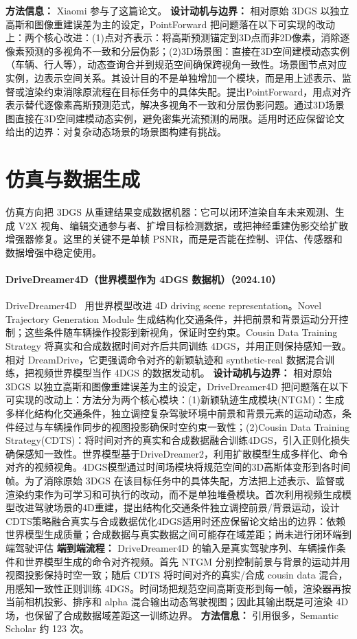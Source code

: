 \textbf{方法信息：} Xiaomi 参与了这篇论文。
\textbf{设计动机与边界：} 相对原始 3DGS 以独立高斯和图像重建误差为主的设定，PointForward 把问题落在以下可实现的改动上：两个核心改进：(1)点对齐表示：将高斯预测锚定到3D点而非2D像素，消除逐像素预测的多视角不一致和分层伪影；(2)3D场景图：直接在3D空间建模动态实例（车辆、行人等），动态查询合并到规范空间确保跨视角一致性。场景图节点对应实例，边表示空间关系。其设计目的不是单独增加一个模块，而是用上述表示、监督或渲染约束消除原流程在目标任务中的具体失配。提出PointForward，用点对齐表示替代逐像素高斯预测范式，解决多视角不一致和分层伪影问题。通过3D场景图直接在3D空间建模动态实例，避免密集光流预测的局限。适用时还应保留论文给出的边界：对复杂动态场景的场景图构建有挑战。

\section{仿真与数据生成}

仿真方向把 3DGS 从重建结果变成数据机器：它可以闭环渲染自车未来观测、生成 V2X 视角、编辑交通参与者、扩增目标检测数据，或把神经重建伪影交给扩散增强器修复。这里的关键不是单帧 PSNR，而是是否能在控制、评估、传感器和数据增强中稳定使用。
\paragraph{DriveDreamer4D（世界模型作为 4DGS 数据机）（2024.10）}
DriveDreamer4D~\cite{2410_13571} 用世界模型改进 4D driving scene representation。Novel Trajectory Generation Module 生成结构化交通条件，并把前景和背景运动分开控制；这些条件随车辆操作投影到新视角，保证时空约束。Cousin Data Training Strategy 将真实和合成数据时间对齐后共同训练 4DGS，并用正则保持感知一致。相对 DreamDrive，它更强调命令对齐的新颖轨迹和 synthetic-real 数据混合训练，把视频世界模型当作 4DGS 的数据发动机。
\textbf{设计动机与边界：} 相对原始 3DGS 以独立高斯和图像重建误差为主的设定，DriveDreamer4D 把问题落在以下可实现的改动上：方法分为两个核心模块：(1)新颖轨迹生成模块(NTGM)：生成多样化结构化交通条件，独立调控复杂驾驶环境中前景和背景元素的运动动态，条件经过与车辆操作同步的视图投影确保时空约束一致性；(2)Cousin Data Training Strategy(CDTS)：将时间对齐的真实和合成数据融合训练4DGS，引入正则化损失确保感知一致性。世界模型基于DriveDreamer2，利用扩散模型生成多样化、命令对齐的视频视角。4DGS模型通过时间场模块将规范空间的3D高斯体变形到各时间帧。为了消除原始 3DGS 在该目标任务中的具体失配，方法把上述表示、监督或渲染约束作为可学习和可执行的改动，而不是单独堆叠模块。首次利用视频生成模型改进驾驶场景的4D重建，提出结构化交通条件独立调控前景/背景运动，设计CDTS策略融合真实与合成数据优化4DGS适用时还应保留论文给出的边界：依赖世界模型生成质量；合成数据与真实数据之间可能存在域差距；尚未进行闭环端到端驾驶评估
\textbf{端到端流程：} DriveDreamer4D 的输入是真实驾驶序列、车辆操作条件和世界模型生成的命令对齐视频。首先 NTGM 分别控制前景与背景的运动并用视图投影保持时空一致；随后 CDTS 将时间对齐的真实/合成 cousin data 混合，用感知一致性正则训练 4DGS。时间场把规范空间高斯变形到每一帧，渲染器再按当前相机投影、排序和 alpha 混合输出动态驾驶视图；因此其输出既是可渲染 4D 场，也保留了合成数据域差距这一训练边界。
\textbf{方法信息：} 引用很多，Semantic Scholar 约 123 次。
